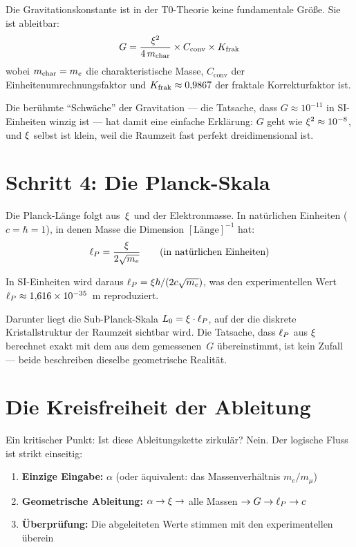 Die Gravitationskonstante ist in der T0-Theorie keine fundamentale Größe. Sie ist ableitbar:
\begin{equation}
G = \frac{\xi^2}{4\,m_{\text{char}}} \times C_{\text{conv}} \times K_{\text{frak}}
\end{equation}
wobei $m_{\text{char}} = m_e$ die charakteristische Masse, $C_{\text{conv}}$ der Einheitenumrechnungsfaktor und $K_{\text{frak}} \approx 0{,}9867$ der fraktale Korrekturfaktor ist.

Die berühmte \enquote{Schwäche} der Gravitation --- die Tatsache, dass $G \approx 10^{-11}$ in SI-Einheiten winzig ist --- hat damit eine einfache Erklärung: $G$ geht wie $\xi^2 \approx 10^{-8}$, und $\xi$ selbst ist klein, weil die Raumzeit fast perfekt dreidimensional ist.

\section{Schritt 4: Die Planck-Skala}

Die Planck-Länge folgt aus~$\xi$ und der Elektronmasse. In natürlichen Einheiten ($c = \hbar = 1$), in denen Masse die Dimension $[\text{Länge}]^{-1}$ hat:
\begin{equation}
\ell_P = \frac{\xi}{2\sqrt{m_e}} \qquad \text{(in natürlichen Einheiten)}
\end{equation}

In SI-Einheiten wird daraus $\ell_P = \xi\hbar/(2c\sqrt{m_e})$, was den experimentellen Wert $\ell_P \approx 1{,}616 \times 10^{-35}$~m reproduziert.

Darunter liegt die Sub-Planck-Skala $L_0 = \xi \cdot \ell_P$, auf der die diskrete Kristallstruktur der Raumzeit sichtbar wird. Die Tatsache, dass $\ell_P$ aus $\xi$ berechnet exakt mit dem aus dem gemessenen~$G$ übereinstimmt, ist kein Zufall --- beide beschreiben dieselbe geometrische Realität.

\section{Die Kreisfreiheit der Ableitung}

Ein kritischer Punkt: Ist diese Ableitungskette zirkulär? Nein. Der logische Fluss ist strikt einseitig:
\begin{enumerate}
\item \textbf{Einzige Eingabe:} $\alpha$ (oder äquivalent: das Massenverhältnis $m_e/m_\mu$)
\item \textbf{Geometrische Ableitung:} $\alpha \to \xi \to$ alle Massen $\to G \to \ell_P \to c$
\item \textbf{Überprüfung:} Die abgeleiteten Werte stimmen mit den experimentellen überein
\end{enumerate}


